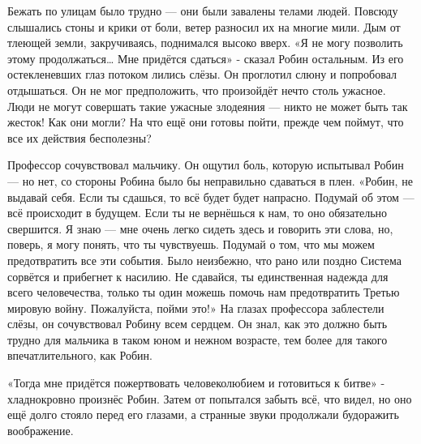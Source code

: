 \documentclass[a4paper,12pt]{book}
\begin{document}
	Бежать по улицам было трудно — они были завалены телами людей. Повсюду слышались стоны и крики от боли, ветер разносил их на многие мили. Дым от тлеющей земли, закручиваясь, поднимался высоко вверх.
	«Я не могу позволить этому продолжаться… Мне придётся сдаться» - сказал Робин остальным. Из его остекленевших глаз потоком лились слёзы. Он проглотил слюну и попробовал отдышаться. Он не мог предположить, что произойдёт нечто столь ужасное. Люди не могут совершать такие ужасные злодеяния — никто не может быть так жесток!
	Как они могли?
	На что ещё они готовы пойти, прежде чем поймут, что все их действия бесполезны?

	Профессор сочувствовал мальчику. Он ощутил боль, которую испытывал Робин — но нет, со стороны Робина было бы неправильно сдаваться в плен.
	«Робин, не выдавай себя. Если ты сдашься, то всё будет будет напрасно. Подумай об этом — всё происходит в будущем. Если ты не вернёшься к нам, то оно обязательно свершится. Я знаю — мне очень легко сидеть здесь и говорить эти слова, но, поверь, я могу понять, что ты чувствуешь. Подумай о том, что мы можем предотвратить все эти события. Было неизбежно, что рано или поздно Система сорвётся и прибегнет к насилию. Не сдавайся, ты единственная надежда для всего человечества, только ты один можешь помочь нам предотвратить Третью мировую войну. Пожалуйста, пойми это!»
	На глазах профессора заблестели слёзы, он сочувствовал Робину всем сердцем. Он знал, как это должно быть трудно для мальчика в таком юном и нежном возрасте, тем более для такого впечатлительного, как Робин.

	«Тогда мне придётся пожертвовать человеколюбием и готовиться к битве» - хладнокровно произнёс Робин. Затем от попытался забыть всё, что видел, но оно ещё долго стояло перед его глазами, а странные звуки продолжали будоражить воображение.
\end{document}
